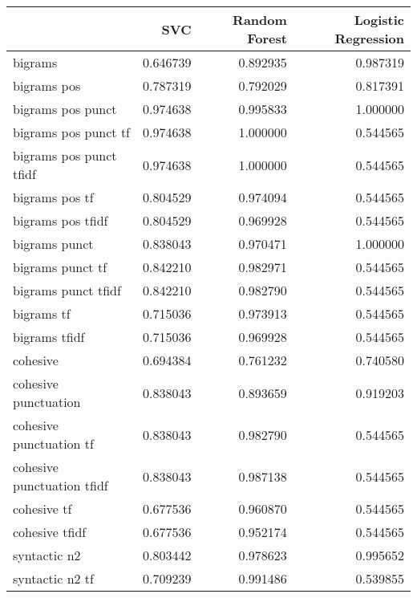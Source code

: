\begin{tabular}{lrrr}
\toprule
{} &       SVC &  Random Forest &  Logistic Regression \\
\midrule
bigrams                    &  0.646739 &       0.892935 &             0.987319 \\
bigrams pos                &  0.787319 &       0.792029 &             0.817391 \\
bigrams pos punct          &  0.974638 &       0.995833 &             1.000000 \\
bigrams pos punct tf       &  0.974638 &       1.000000 &             0.544565 \\
bigrams pos punct tfidf    &  0.974638 &       1.000000 &             0.544565 \\
bigrams pos tf             &  0.804529 &       0.974094 &             0.544565 \\
bigrams pos tfidf          &  0.804529 &       0.969928 &             0.544565 \\
bigrams punct              &  0.838043 &       0.970471 &             1.000000 \\
bigrams punct tf           &  0.842210 &       0.982971 &             0.544565 \\
bigrams punct tfidf        &  0.842210 &       0.982790 &             0.544565 \\
bigrams tf                 &  0.715036 &       0.973913 &             0.544565 \\
bigrams tfidf              &  0.715036 &       0.969928 &             0.544565 \\
cohesive                   &  0.694384 &       0.761232 &             0.740580 \\
cohesive punctuation       &  0.838043 &       0.893659 &             0.919203 \\
cohesive punctuation tf    &  0.838043 &       0.982790 &             0.544565 \\
cohesive punctuation tfidf &  0.838043 &       0.987138 &             0.544565 \\
cohesive tf                &  0.677536 &       0.960870 &             0.544565 \\
cohesive tfidf             &  0.677536 &       0.952174 &             0.544565 \\
syntactic n2               &  0.803442 &       0.978623 &             0.995652 \\
syntactic n2 tf            &  0.709239 &       0.991486 &             0.539855 \\

\end{tabular}
